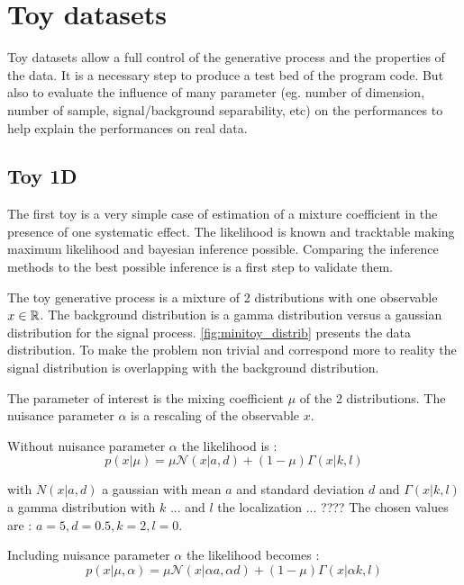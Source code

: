 \section{Toy datasets} %
\label{sec:toy_datasets}


Toy datasets allow a full control of the generative process and the properties of the data.
It is a necessary step to produce a test bed of the program code.
But also to evaluate the influence of many parameter (eg. number of dimension, number of sample, signal/background separability, etc) on the performances to help explain the performances on real data.






\subsection{Toy 1D} %
\label{sub:toy_1d}

The first toy is a very simple case of estimation of a mixture coefficient in the presence of one systematic effect.
The likelihood is known and tracktable making maximum likelihood and bayesian inference possible.
Comparing the inference methods to the best possible inference is a first step to validate them.


The toy generative process is a mixture of 2 distributions with one observable $x \in \mathbb{R}$.
The background distribution is a gamma distribution versus a gaussian distribution for the signal process.
\autoref{fig:minitoy_distrib} presents the data distribution.
To make the problem non trivial and correspond more to reality the signal distribution is overlapping with the background distribution.

The parameter of interest is the mixing coefficient $\mu$ of the 2 distributions.
The nuisance parameter $\alpha$ is a rescaling of the observable $x$.

Without nuisance parameter $\alpha$ the likelihood is :
$$
    p(x | \mu) = \mu \mathcal N(x|a, d) + (1-\mu) \Gamma(x|k, l)
$$

with $N(x|a, d)$ a gaussian with mean $a$ and standard deviation $d$ and $\Gamma(x|k, l)$ a gamma distribution with $k$ ... and $l$ the localization  ... ????
The chosen values are : $a = 5, d=0.5, k=2, l=0$.


Including nuisance parameter $\alpha$ the likelihood becomes :
$$
    p(x | \mu, \alpha) = \mu \mathcal N(x|\alpha a, \alpha d) + (1-\mu) \Gamma(x|\alpha k, l)
$$

